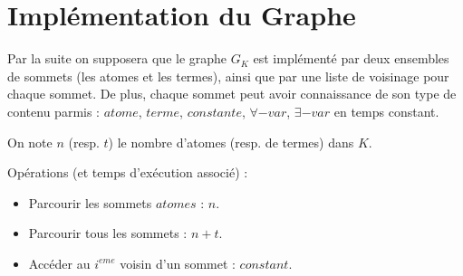 \section{Impl\'ementation du Graphe}\label{def_graphe}
Par la suite on supposera que le graphe $G_{K}$ est impl\'ement\'e par deux ensembles de sommets (les atomes et les termes), ainsi que par une liste de voisinage pour chaque sommet.
De plus, chaque sommet peut avoir connaissance de son type de contenu parmis : $atome$, $terme$, $constante$, $\forall-var$, $\exists-var$
en temps constant.

On note $n$ (resp. $t$) le nombre d'atomes (resp. de termes) dans $K$. 

Op\'erations (et temps d'ex\'ecution associ\'e) :
\begin{itemize}
	\item Parcourir les sommets $atomes$ : $n$.
	\item Parcourir tous les sommets : $n + t$.
	\item Acc\'eder au $i^{eme}$ voisin d'un sommet : $constant$.
\end{itemize}


